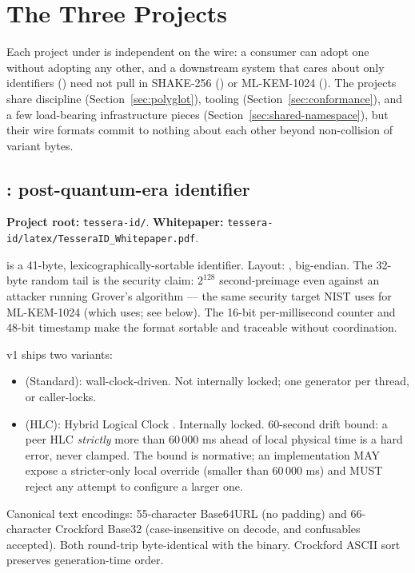 \section{The Three Projects}
\label{sec:three-projects}

Each project under \tessera{} is independent on the wire: a consumer can adopt one without adopting any other, and a downstream system that cares about only identifiers (\tesseraid{}) need not pull in SHAKE-256 (\tesserahash{}) or ML-KEM-1024 (\tesseraseal{}). The projects share discipline (Section~\ref{sec:polyglot}), tooling (Section~\ref{sec:conformance}), and a few load-bearing infrastructure pieces (Section~\ref{sec:shared-namespace}), but their wire formats commit to nothing about each other beyond non-collision of variant bytes.

\subsection{\tesseraid{}: post-quantum-era identifier}

\textbf{Project root:} \texttt{tessera-id/}. \textbf{Whitepaper:} \texttt{tessera-id/latex/TesseraID\_Whitepaper.pdf}.

\tesseraid{} is a 41-byte, lexicographically-sortable identifier. Layout: , big-endian. The 32-byte random tail is the security claim: $2^{128}$ second-preimage even against an attacker running Grover's algorithm \citep{grover1996} --- the same security target NIST uses for ML-KEM-1024 \citep{fips203} (which \tesseraseal{} uses; see below). The 16-bit per-millisecond counter and 48-bit timestamp make the format sortable and traceable without coordination.

\tesseraid{} v1 ships two variants:
\begin{itemize}
\item {} (Standard): wall-clock-driven. Not internally locked; one generator per thread, or caller-locks.
\item {} (HLC): Hybrid Logical Clock \citep{kulkarni2014hlc}. Internally locked. 60-second drift bound: a peer HLC \emph{strictly} more than 60\,000 ms ahead of local physical time is a hard error, never clamped. The bound is normative; an implementation MAY expose a stricter-only local override (smaller than 60\,000 ms) and MUST reject any attempt to configure a larger one.
\end{itemize}

Canonical text encodings: 55-character Base64URL \citep{rfc4648} (no padding) and 66-character Crockford Base32 \citep{crockford} (case-insensitive on decode,  and  confusables accepted). Both round-trip byte-identical with the binary. Crockford ASCII sort preserves generation-time order.

